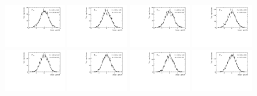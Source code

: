 \begin{figure}
\includegraphics[width=0.24\textwidth]{figs/kpimm/angular-analysis/toys/pull_m_30.pdf}
\includegraphics[width=0.24\textwidth]{figs/kpimm/angular-analysis/toys/pull_m_31.pdf}
\includegraphics[width=0.24\textwidth]{figs/kpimm/angular-analysis/toys/pull_m_32.pdf}
\includegraphics[width=0.24\textwidth]{figs/kpimm/angular-analysis/toys/pull_m_33.pdf}
\includegraphics[width=0.24\textwidth]{figs/kpimm/angular-analysis/toys/pull_m_34.pdf}
\includegraphics[width=0.24\textwidth]{figs/kpimm/angular-analysis/toys/pull_m_35.pdf}
\includegraphics[width=0.24\textwidth]{figs/kpimm/angular-analysis/toys/pull_m_36.pdf}
\includegraphics[width=0.24\textwidth]{figs/kpimm/angular-analysis/toys/pull_m_37.pdf}

\end{figure}
